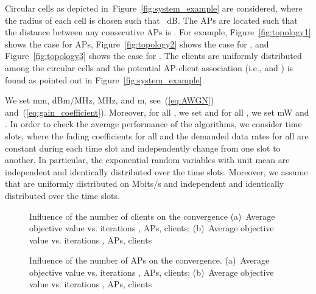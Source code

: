 \documentclass[journal, 10pt, twocolumn]{IEEEtran}
\begin{document}
Circular cells as depicted in~Figure~\ref{fig:system_example} are considered, where the radius of each cell  is chosen such that ~dB. The APs are located such that the distance between any consecutive APs is . For example, Figure~\ref{fig:topology1} shows the case for  APs, Figure~\ref{fig:topology2} shows the case for , and Figure~\ref{fig:topology3} shows the case for . The clients are uniformly distributed among the circular cells and the potential AP-client association (i.e.,  and ) is found as pointed out in Figure~\ref{fig:system_example}.

We set mm, dBm/MHz, MHz, and m, see~(\ref{eq:AWGN}) and~(\ref{eq:gain_coefficient}). Moreover, for all , we set  and for all , we set mW and . In order to check the average performance of the algorithms, we consider  time slots, where the fading coefficients  for all  and the demanded data rates  for all  are constant during each time slot  and independently change from one slot to another. In particular, the exponential random variables  with unit mean are independent and identically distributed over the time slots. Moreover, we assume that  are uniformly distributed on Mbits/s and independent and identically distributed over the time slots.

\begin{figure}[t]
\centering
{}
\goodgap
{}\vspace{-2mm}
\caption{Influence of the number of clients on the convergence (a)~Average objective value  vs. iterations ,  APs,  clients; (b)~Average objective value  vs. iterations ,  APs,  clients}
\label{fig:Bound_illustration_all0}
\vspace{-0.4cm}
\end{figure}

\begin{figure}[t]
\centering
{}
\goodgap
{}\vspace{-2mm}
\caption{Influence of the number of APs on the convergence. (a)~Average objective value  vs. iterations ,  APs,  clients; (b)~Average objective value  vs. iterations ,  APs,  clients}
\label{fig:Bound_illustration_all1}
\vspace{-0.3cm}
\end{figure}
\end{document}
